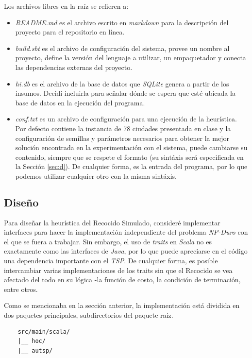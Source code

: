 \documentclass[12pt]{article}
\begin{document}
Los archivos libres en la raíz se refieren a:
\begin{itemize}
\item \textit{README.md} es el archivo escrito en \textit{markdown} para
  la descripción del proyecto para el repositorio en línea.
\item \textit{build.sbt}  es el archivo de configuración del sistema,
  provee un nombre al proyecto, define la versión del lenguaje a utilizar, un empaquetador y conecta las dependencias externas del proyecto.
\item \textit{hi.db} es el archivo de la base de datos que \textit{SQLite} genera a partir de los insumos. Decidí incluirla para señalar
  dónde se espera que esté ubicada la base de datos en la ejecución del
  programa. 
\item \textit{conf.txt} es un archivo de configuración para una ejecución de la heurística. Por defecto contiene la instancia de 78 ciudades presentada en clase y la configuración de semillas y parámetros necesarios
  para obtener la mejor solución encontrada en la experimentación con el
  sistema, puede cambiarse su contenido, siempre que se respete el formato (su sintáxis será especificada en la Sección \ref{sec:d}). De cualquier forma, es la entrada del programa, por lo que podemos utilizar cualquier otro con la misma sintáxis.
\end{itemize}

\subsection{Diseño}\label{sec:c}
Para diseñar la heurística del Recocido Simulado, consideré implementar
interfaces para hacer la implementación independiente del
problema \textit{NP-Duro} con el que se fuera a trabajar. Sin embargo,
el uso de \textit{traits} en \textit{Scala} no es exactamente como
las interfaces de \textit{Java}, por lo que puede apreciarse en el código una dependencia importante con el \textit{TSP}. De cualquier forma, es posible intercambiar varias implementaciones de los traits sin que el Recocido se vea afectado del todo en su lógica -la función de costo, la condición de terminación, entre otros.

Como se mencionaba en la sección anterior, la implementación está dividida en dos paquetes principales, subdirectorios del paquete raíz.
\begin{verbatim}
    src/main/scala/
    |__ hoc/
    |__ autsp/
\end{verbatim}
\end{document}
